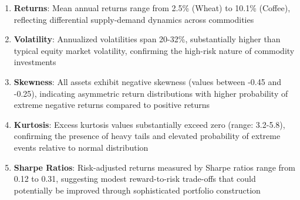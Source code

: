 \documentclass[
  10pt,
  a4paper,
]{article}
\begin{document}
\begin{enumerate}
\def\labelenumi{\arabic{enumi}.}
\item
  \textbf{Returns}: Mean annual returns range from 2.5\% (Wheat) to
  10.1\% (Coffee), reflecting differential supply-demand dynamics across
  commodities
\item
  \textbf{Volatility}: Annualized volatilities span 20-32\%,
  substantially higher than typical equity market volatility, confirming
  the high-risk nature of commodity investments
\item
  \textbf{Skewness}: All assets exhibit negative skewness (values
  between -0.45 and -0.25), indicating asymmetric return distributions
  with higher probability of extreme negative returns compared to
  positive returns
\item
  \textbf{Kurtosis}: Excess kurtosis values substantially exceed zero
  (range: 3.2-5.8), confirming the presence of heavy tails and elevated
  probability of extreme events relative to normal distribution
\item
  \textbf{Sharpe Ratios}: Risk-adjusted returns measured by Sharpe
  ratios range from 0.12 to 0.31, suggesting modest reward-to-risk
  trade-offs that could potentially be improved through sophisticated
  portfolio construction
\end{enumerate}
\end{document}
